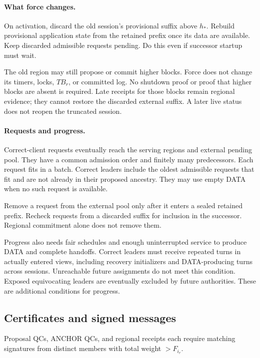 \documentclass[11pt,a4paper]{article}
\begin{document}
\paragraph{What force changes.}
On activation, discard the old session's provisional suffix above $h_*$.
Rebuild provisional application state from the retained prefix once its
data are available. Keep discarded admissible requests pending.
Do this even if successor startup must wait.

The old region may still propose or commit higher blocks.
Force does not change its timers, locks, $TB_r$, or committed log.
No shutdown proof or proof that higher blocks are absent is required.
Late receipts for those blocks remain regional evidence; they cannot
restore the discarded external suffix.
A later live status does not reopen the truncated session.

\paragraph{Requests and progress.}
Correct-client requests eventually reach the serving regions and external
pending pool. They have a common admission order and finitely many
predecessors. Each request fits in a batch.
Correct leaders include the oldest admissible requests that fit and are
not already in their proposed ancestry.
They may use empty DATA when no such request is available.

Remove a request from the external pool only after it enters a sealed
retained prefix. Recheck requests from a discarded suffix for inclusion
in the successor. Regional commitment alone does not remove them.

Progress also needs fair schedules and enough uninterrupted service to
produce DATA and complete handoffs.
Correct leaders must receive repeated turns in actually entered views,
including recovery initializers and DATA-producing turns across sessions.
Unreachable future assignments do not meet this condition.
Exposed equivocating leaders are eventually excluded by future authorities.
These are additional conditions for progress.

\subsection{Certificates and signed messages}
\label{sec:certificates}
Proposal QCs, ANCHOR QCs, and regional receipts each require matching
signatures from distinct members with total weight $>F_{i_r}$.
\end{document}
